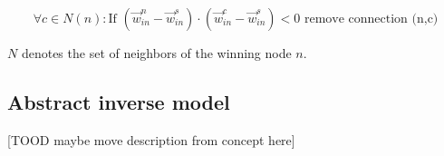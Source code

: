 \begin{equation}
\forall c \in N(n): \text{If~} (\vec{w}^n_{in}-\vec{w}^s_{in}) \cdot (\vec{w}^c_{in}-\vec{w}^s_{in}) < 0 \text{~remove connection (n,c)}
\end{equation}

$N$ denotes the set of neighbors of the winning node $n$.

\subsection{Abstract inverse model}
[TOOD maybe move description from concept here]
